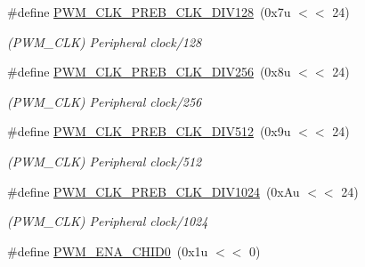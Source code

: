 \begin{DoxyCompactItemize}
\mbox{\label{group__SAMS70__PWM_gae47109fac5979f7f7f1db16ae132e46c}} 
\#define \mbox{\hyperlink{group__SAMS70__PWM_gae47109fac5979f7f7f1db16ae132e46c}{P\+W\+M\+\_\+\+C\+L\+K\+\_\+\+P\+R\+E\+B\+\_\+\+C\+L\+K\+\_\+\+D\+I\+V128}}~(0x7u $<$$<$ 24)
\begin{DoxyCompactList}\small\item\em (P\+W\+M\+\_\+\+C\+LK) Peripheral clock/128 \end{DoxyCompactList}\item 
\mbox{\label{group__SAMS70__PWM_gaaf3614b1a76b5b63428c8231cc383504}} 
\#define \mbox{\hyperlink{group__SAMS70__PWM_gaaf3614b1a76b5b63428c8231cc383504}{P\+W\+M\+\_\+\+C\+L\+K\+\_\+\+P\+R\+E\+B\+\_\+\+C\+L\+K\+\_\+\+D\+I\+V256}}~(0x8u $<$$<$ 24)
\begin{DoxyCompactList}\small\item\em (P\+W\+M\+\_\+\+C\+LK) Peripheral clock/256 \end{DoxyCompactList}\item 
\mbox{\label{group__SAMS70__PWM_gaa53b1dd4e614b72e3637aa44763d1620}} 
\#define \mbox{\hyperlink{group__SAMS70__PWM_gaa53b1dd4e614b72e3637aa44763d1620}{P\+W\+M\+\_\+\+C\+L\+K\+\_\+\+P\+R\+E\+B\+\_\+\+C\+L\+K\+\_\+\+D\+I\+V512}}~(0x9u $<$$<$ 24)
\begin{DoxyCompactList}\small\item\em (P\+W\+M\+\_\+\+C\+LK) Peripheral clock/512 \end{DoxyCompactList}\item 
\mbox{\label{group__SAMS70__PWM_gae9f6d0e24b13520c2a68e86b083210e2}} 
\#define \mbox{\hyperlink{group__SAMS70__PWM_gae9f6d0e24b13520c2a68e86b083210e2}{P\+W\+M\+\_\+\+C\+L\+K\+\_\+\+P\+R\+E\+B\+\_\+\+C\+L\+K\+\_\+\+D\+I\+V1024}}~(0x\+Au $<$$<$ 24)
\begin{DoxyCompactList}\small\item\em (P\+W\+M\+\_\+\+C\+LK) Peripheral clock/1024 \end{DoxyCompactList}\item 
\mbox{\label{group__SAMS70__PWM_ga77c0afa3572c801d2b6cd0290b28aa4b}} 
\#define \mbox{\hyperlink{group__SAMS70__PWM_ga77c0afa3572c801d2b6cd0290b28aa4b}{P\+W\+M\+\_\+\+E\+N\+A\+\_\+\+C\+H\+I\+D0}}~(0x1u $<$$<$ 0)
$$
\end{DoxyCompactItemize}
